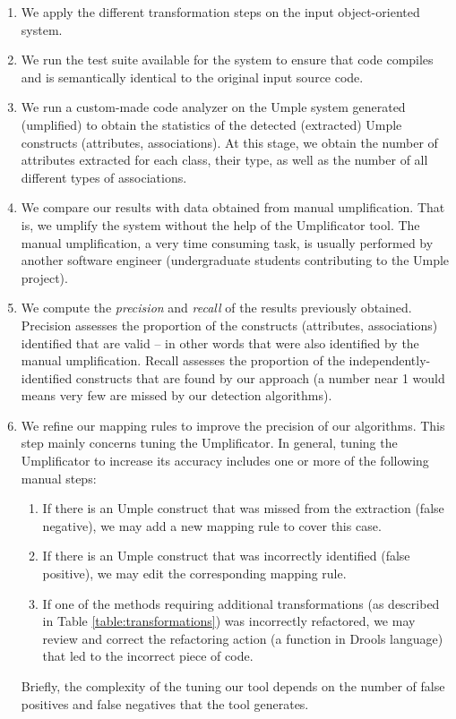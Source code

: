 \begin{enumerate}
\item We apply the different transformation steps on the input object-oriented system.

\item We run the test suite available for the system to ensure that code compiles and is semantically identical to the original input source code.

\item We run a custom-made code analyzer on the Umple system generated (umplified) to obtain the statistics of the detected (extracted) Umple constructs (attributes, associations). At this stage, we obtain the number of attributes extracted for each class, their type, as well as the number of all different types of associations.	

\item We compare our results with data obtained from manual umplification. That is, we umplify the system without the help of the Umplificator tool. The manual 	umplification, a very time consuming task, is usually performed by another software engineer (undergraduate students contributing to the Umple project). 

\item We compute the \textit{precision} and \textit{recall} of the results previously obtained. Precision assesses the proportion of the constructs (attributes, associations) identified that are valid -- in other words that were also identified by the manual umplification. Recall assesses the proportion of the independently-identified constructs that are found by our approach (a number near 1 would means very few are missed by our detection algorithms). 

\item We refine our mapping rules to improve the precision of our algorithms. This step mainly concerns tuning the Umplificator. In general, tuning the Umplificator to increase its accuracy includes one or more of the following manual steps:

	\begin{enumerate}
		\item If there is an Umple construct that was missed from the extraction (false negative), we may add a new mapping rule to cover this case.
		
		\item If there is an Umple construct that was incorrectly identified (false positive), we may edit the corresponding mapping rule.
		\item If one of the methods requiring additional transformations (as described in Table \ref{table:transformations}) was incorrectly refactored, we may review and correct the refactoring action (a function in Drools language) that led to the incorrect piece of code.
	\end{enumerate}
Briefly, the complexity of the tuning our tool depends on the number of false positives and false negatives that the tool generates. 
\end{enumerate}

